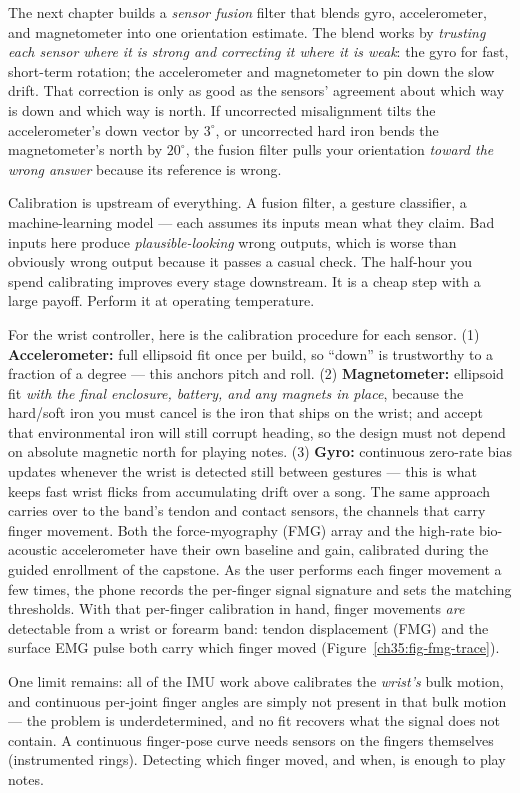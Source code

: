 The next chapter builds a \emph{sensor fusion} filter that blends gyro, accelerometer, and magnetometer into one orientation estimate. The blend works by \emph{trusting
each sensor where it is strong and correcting it where it is weak}: the gyro for
fast, short-term rotation; the accelerometer and magnetometer to pin down the
slow drift. That correction is only as good as the sensors' agreement about
which way is down and which way is north. If uncorrected misalignment tilts the accelerometer's down vector by
$3^\circ$, or uncorrected hard iron bends the magnetometer's north by
$20^\circ$, the fusion filter pulls your
orientation \emph{toward the wrong answer} because its
reference is wrong.

\begin{aestheticbox}
Calibration is upstream of everything. A fusion filter, a gesture classifier, a
machine-learning model --- each assumes its inputs mean what they claim. Bad inputs
here produce \emph{plausible-looking} wrong outputs, which is worse than obviously
wrong output because it passes a casual check. The half-hour you spend calibrating
improves every stage downstream. It is a cheap step with a large payoff. Perform it at operating temperature.
\end{aestheticbox}

\begin{goalbox}
For the wrist controller, here is the calibration procedure for each
sensor. (1) \textbf{Accelerometer:} full
ellipsoid fit once per build, so ``down'' is trustworthy to a fraction of a
degree --- this anchors pitch and roll. (2) \textbf{Magnetometer:} ellipsoid fit
\emph{with the final enclosure, battery, and any magnets in place}, because the
hard/soft iron you must cancel is the iron that ships on the wrist; and accept
that environmental iron will still corrupt heading, so the design must
not depend on absolute magnetic north for playing notes. (3) \textbf{Gyro:}
continuous zero-rate bias updates whenever the wrist is detected still between
gestures --- this is what keeps fast wrist flicks from accumulating drift over a
song. The same approach carries over to the band's tendon and contact sensors,
the channels that carry finger movement. Both the force-myography (FMG) array
and the high-rate bio-acoustic accelerometer have
their own baseline and gain, calibrated during the guided
enrollment of the capstone. As the user performs each finger movement a few
times, the phone records the per-finger signal signature and sets the matching
thresholds. With that per-finger calibration in hand, finger movements \emph{are}
detectable from a wrist or forearm band: tendon displacement (FMG) and the surface
EMG pulse both carry which finger moved
(Figure~\ref{ch35:fig-fmg-trace}).

One limit remains: all of the IMU work above calibrates the
\emph{wrist's} bulk motion, and continuous per-joint finger angles are simply not
present in that bulk motion --- the problem is underdetermined, and no fit recovers
what the signal does not contain. A continuous finger-pose curve needs sensors on
the fingers themselves (instrumented rings). Detecting which finger moved, and when, is enough to play notes.
\end{goalbox}


